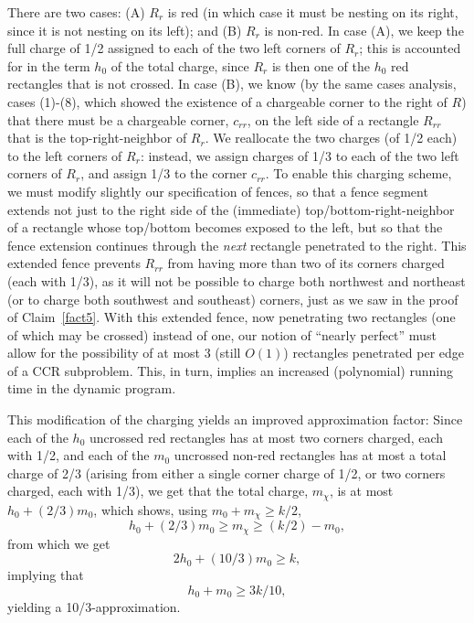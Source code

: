 \documentclass{article}
\begin{document}
There are two cases: (A) $R_r$ is red (in which case it must be nesting on its right, since it is not nesting on its left); and
(B) $R_r$ is non-red.
In case (A), we keep the full charge of 1/2 assigned to each of the two left corners of $R_r$;
this is accounted for in the term $h_0$ of the total charge, since $R_r$ is then one of the $h_0$ red rectangles that is
not crossed.
In case (B), we know (by the same cases analysis, cases (1)-(8), which showed the existence of a chargeable corner to the right of $R$) that there must be a chargeable corner, $c_{rr}$, on the
left side of a rectangle $R_{rr}$ that is the top-right-neighbor of $R_r$. We reallocate the two charges (of 1/2 each) to the left
corners of $R_r$: instead, we assign charges of 1/3 to each of the two left corners of $R_r$, and assign 1/3 to the corner $c_{rr}$.
To enable this charging scheme, we must modify slightly our specification of fences, so that a fence segment extends not just to the right side of the 
(immediate) top/bottom-right-neighbor of a rectangle whose top/bottom becomes exposed to the left, but so that the fence extension continues through the
{\em next} rectangle penetrated to the right. This extended fence prevents $R_{rr}$ from having more than two of its corners charged (each with 1/3),
as it will not be possible to charge both northwest and northeast (or to charge both southwest and southeast) corners, just as we saw in the proof of Claim~\ref{fact5}.
With this extended fence, now penetrating two rectangles (one of which may be crossed) instead of one,  our notion of ``nearly perfect'' must allow for the possibility of at most 3 (still $O(1)$) rectangles penetrated per edge of
a CCR subproblem.  This, in turn, implies an increased (polynomial) running time in the dynamic program.

This modification of the charging yields an improved approximation
factor: Since each of the $h_0$ uncrossed red rectangles has at most two corners charged, each with 1/2, and each of the $m_0$ uncrossed non-red rectangles has at most a total charge of 2/3 (arising from either a single corner charge of 1/2, or two corners charged, each with 1/3), we get that the total charge, $m_\chi$, is at most $h_0 +
(2/3)m_0$, which shows, using $m_0+m_\chi\geq k/2$,
%
$$h_0+(2/3)m_0 \geq m_\chi \geq (k/2) - m_0,$$
%
from which we get
%
$$2h_0 + (10/3)m_0 \geq k,$$
%
implying that
%
$$h_0+m_0\geq 3k/10,$$
%
yielding a 10/3-approximation.
\end{document}
